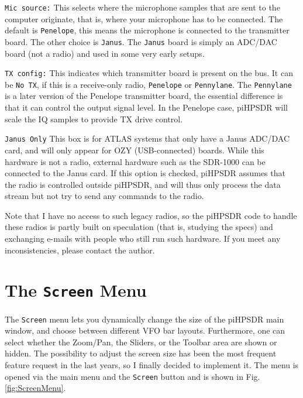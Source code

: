 \documentclass[12pt]{book}
\def\rett#1{\texttt{\color{red}#1}}
\def\bltt#1{\texttt{\color{blue}#1}}
\def\pH{pi\-HPSDR\xspace}
\begin{document}
\rett{Mic source:} This selects where the microphone samples that are sent to the computer
originate, that is, where your microphone has to be connected. The default is
\texttt{Penelope}, this means the microphone is connected to the transmitter board. The
other choice is \texttt{Janus}. The \texttt{Janus} board is simply an ADC/DAC board (not
a radio) and used in some very early setups.

\rett{TX config:} This indicates which transmitter board is present on the bus. It can
be \texttt{No TX}, if this is a receive-only radio, \texttt{Penelope} or \texttt{Pennylane}.
The \texttt{Pennylane} is a later version of the Penelope transmitter board, the essential
difference is that it can control the output signal level. In the Penelope case,
\pH will scale the IQ samples to provide TX drive control.

\rett{Janus Only} This box is for ATLAS systems that only have a Janus ADC/DAC card,
and will only appear for OZY (USB-connected) boards. While this hardware is not a radio,
external hardware such as the SDR-1000 can be connected to the Janus card. If this
option is checked, \pH assumes that the radio is controlled outside \pH, and
will thus only process the data stream but not try to send any commands to the radio.

Note that I have no access to such legacy radios, so the \pH code to handle these radios
is partly built on speculation (that is, studying the specs) and exchanging e-mails with
people who still run such hardware. If you meet any inconsistencies, please contact
the author.

\section{The \texttt{Screen} Menu}

The \bltt{Screen} menu lets you dynamically change the size of the \pH main
window, and choose between different VFO bar layouts. Furthermore, one
can select whether the Zoom/Pan, the Sliders, or the Toolbar area are shown or hidden.
The possibility to adjust
the screen size has been the most frequent feature request in the last years,
so I finally decided to implement it. The menu is opened
via the main menu and the \bltt{Screen} button and is shown in Fig. \ref{fig:ScreenMenu}.
\end{document}
